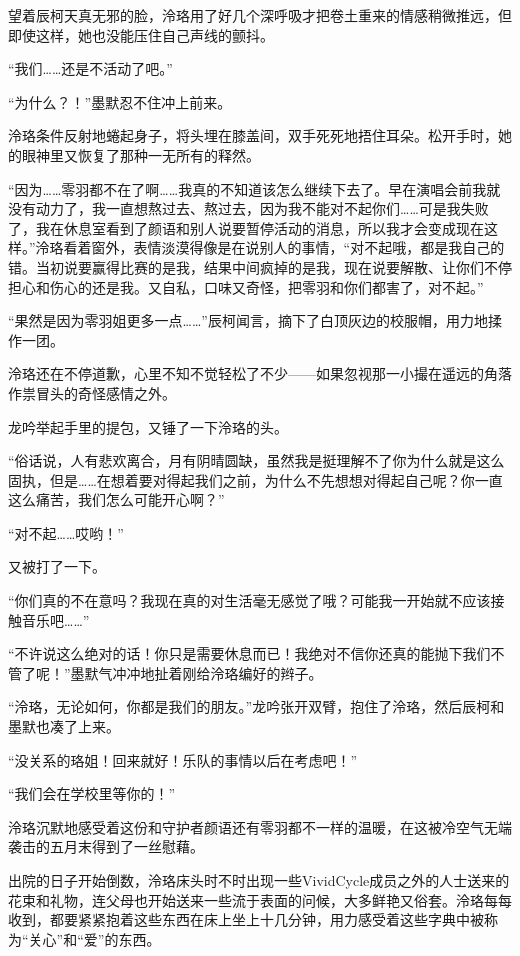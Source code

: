 \documentclass[UTF8, scheme = chinese, openany]{ctexbook}
\begin{document}
望着辰柯天真无邪的脸，泠珞用了好几个深呼吸才把卷土重来的情感稍微推远，但即使这样，她也没能压住自己声线的颤抖。

“我们……还是不活动了吧。”

“为什么？！”墨默忍不住冲上前来。

泠珞条件反射地蜷起身子，将头埋在膝盖间，双手死死地捂住耳朵。松开手时，她的眼神里又恢复了那种一无所有的释然。

“因为……零羽都不在了啊……我真的不知道该怎么继续下去了。早在演唱会前我就没有动力了，我一直想熬过去、熬过去，因为我不能对不起你们……可是我失败了，我在休息室看到了颜语和别人说要暂停活动的消息，所以我才会变成现在这样。”泠珞看着窗外，表情淡漠得像是在说别人的事情，“对不起哦，都是我自己的错。当初说要赢得比赛的是我，结果中间疯掉的是我，现在说要解散、让你们不停担心和伤心的还是我。又自私，口味又奇怪，把零羽和你们都害了，对不起。”

“果然是因为零羽姐更多一点……”辰柯闻言，摘下了白顶灰边的校服帽，用力地揉作一团。

泠珞还在不停道歉，心里不知不觉轻松了不少——如果忽视那一小撮在遥远的角落作祟冒头的奇怪感情之外。

龙吟举起手里的提包，又锤了一下泠珞的头。

“俗话说，人有悲欢离合，月有阴晴圆缺，虽然我是挺理解不了你为什么就是这么固执，但是……在想着要对得起我们之前，为什么不先想想对得起自己呢？你一直这么痛苦，我们怎么可能开心啊？”

“对不起……哎哟！”

又被打了一下。

“你们真的不在意吗？我现在真的对生活毫无感觉了哦？可能我一开始就不应该接触音乐吧……”

“不许说这么绝对的话！你只是需要休息而已！我绝对不信你还真的能抛下我们不管了呢！”墨默气冲冲地扯着刚给泠珞编好的辫子。

“泠珞，无论如何，你都是我们的朋友。”龙吟张开双臂，抱住了泠珞，然后辰柯和墨默也凑了上来。

“没关系的珞姐！回来就好！乐队的事情以后在考虑吧！”

“我们会在学校里等你的！”

泠珞沉默地感受着这份和守护者颜语还有零羽都不一样的温暖，在这被冷空气无端袭击的五月末得到了一丝慰藉。

\vspace{1.5em}

出院的日子开始倒数，泠珞床头时不时出现一些VividCycle成员之外的人士送来的花束和礼物，连父母也开始送来一些流于表面的问候，大多鲜艳又俗套。泠珞每每收到，都要紧紧抱着这些东西在床上坐上十几分钟，用力感受着这些字典中被称为“关心”和“爱”的东西。
\end{document}
